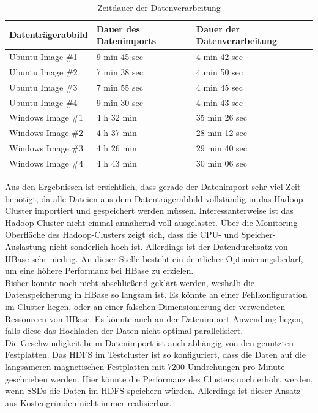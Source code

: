 \begin{table}[ht]
\centering
\begin{tabular}{l|l|l}
Datenträgerabbild & Dauer des Datenimports & Dauer der Datenverarbeitung	\\ \hline
Ubuntu Image \#1 		& 9 min 45 sec	& 4 min 42 sec  \\
Ubuntu Image \#2 		& 7 min 38 sec	& 4 min 50 sec  \\
Ubuntu Image \#3 		& 7 min 55 sec	& 4 min 45 sec  \\
Ubuntu Image \#4 		& 9 min 30 sec	& 4 min 43 sec	\\ \hline
Windows Image \#1 		& 4 h 32 min		& 35 min 26 sec	\\
Windows Image \#2 		& 4 h 37 min		& 28 min 12 sec	\\
Windows Image \#3 		& 4 h 26 min		& 29 min 40 sec	\\
Windows Image \#4 		& 4 h 43 min		& 30 min 06 sec	\\
\end{tabular}
\caption{Zeitdauer der Datenverarbeitung}
\label{tab:performance_results}
\end{table}

\noindent
Aus den Ergebnissen ist ersichtlich, dass gerade der Datenimport sehr viel Zeit benötigt, da alle Dateien aus dem Datenträgerabbild vollständig in das Hadoop-Cluster importiert und gespeichert werden müssen. Interessanterweise ist das Hadoop-Cluster nicht einmal annähernd voll ausgelastet. Über die Monitoring-Oberfläche des Hadoop-Clusters zeigt sich, dass die CPU- und Speicher-Auslastung nicht sonderlich hoch ist. Allerdings ist der Datendurchsatz von HBase sehr niedrig. An dieser Stelle besteht ein deutlicher Optimierungsbedarf, um eine höhere Performanz bei HBase zu erzielen.\\
Bisher konnte noch nicht abschließend geklärt werden, weshalb die Datenspeicherung in HBase so langsam ist. Es könnte an einer Fehlkonfiguration im Cluster liegen, oder an einer falschen Dimensionierung der verwendeten Ressourcen von HBase. Es könnte auch an der Datenimport-Anwendung liegen, falls diese das Hochladen der Daten nicht optimal parallelisiert.\\

\noindent
Die Geschwindigkeit beim Datenimport ist auch abhängig von den genutzten Festplatten. Das HDFS im Testcluster ist so konfiguriert, dass die Daten auf die langsameren magnetischen Festplatten mit 7200 Umdrehungen pro Minute geschrieben werden. 
Hier könnte die Performanz des Clusters noch erhöht werden, wenn SSDs die Daten im HDFS speichern würden. Allerdings ist dieser Ansatz aus Kostengründen nicht immer realisierbar.\\

